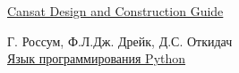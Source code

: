 \begin{thebibliography}{99}

\href{http://www.cansatcompetition.com/docs/cansat_construction.pdf}{Cansat Design and Construction Guide}

Г. Россум, Ф.Л.Дж. Дрейк, Д.С. Откидач\\
\href{http://rus-linux.net/MyLDP/BOOKS/python.pdf}{Язык программирования Python}

\end{thebibliography}
